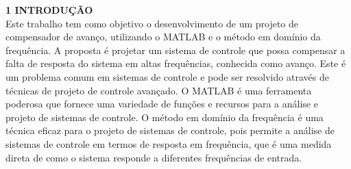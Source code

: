 \noindent \textcolor{myBlue}{\textbf{\large{1 INTRODUÇÃO }}}\\

Este trabalho tem como objetivo o desenvolvimento de um projeto de compensador de avanço, utilizando o MATLAB e o método em domínio da frequência. A proposta é projetar um sistema de controle que possa compensar a falta de resposta do sistema em altas frequências, conhecida como avanço. Este é um problema comum em sistemas de controle e pode ser resolvido através de técnicas de projeto de controle avançado. O MATLAB é uma ferramenta poderosa que fornece uma variedade de funções e recursos para a análise e projeto de sistemas de controle. O método em domínio da frequência é uma técnica eficaz para o projeto de sistemas de controle, pois permite a análise de sistemas de controle em termos de resposta em frequência, que é uma medida direta de como o sistema responde a diferentes frequências de entrada. \\